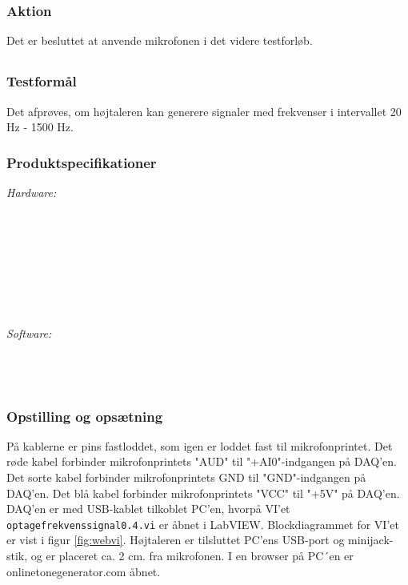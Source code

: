 		\subsubsection{Aktion}
		Det er besluttet at anvende mikrofonen i det videre testforløb. 
		
\subsection{}
		\subsubsection{Testformål}
		Det afprøves, om højtaleren kan generere signaler med frekvenser i intervallet 20 Hz - 1500 Hz.
		
		\subsubsection{Produktspecifikationer}
	
			\textit{Hardware:}\\
			\elektretto\\
			\pinstre\\
			\mikrofonkabel\\
			\krympeflex\\
			\daq\\
			\daqusb\\	
			\\		
			\PC\\
	
			\textit{Software:}\\
			\labview\\
			\daqsoft\\
			\onlineg\\
	
		\subsubsection{Opstilling og opsætning}
		På kablerne er pins fastloddet, som igen er loddet fast til mikrofonprintet. Det røde kabel forbinder mikrofonprintets "AUD" til "+AI0"-indgangen på DAQ'en. Det sorte kabel forbinder mikrofonprintets GND til "GND"-indgangen på DAQ'en. Det blå kabel forbinder mikrofonprintets "VCC" til "+5V" på DAQ'en. DAQ'en er med USB-kablet tilkoblet PC'en, hvorpå VI'et \texttt{optagefrekvenssignal0.4.vi} er åbnet i LabVIEW. Blockdiagrammet for VI'et er vist i figur \ref{fig:webvi}. Højtaleren er tilsluttet PC'ens USB-port og minijack-stik, og er placeret ca. 2 cm. fra mikrofonen. I en browser på PC´en er onlinetonegenerator.com åbnet.       
		
